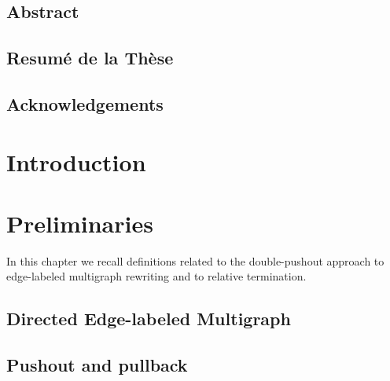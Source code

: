 \documentclass{report}
\begin{document}
  
   
  
 
\newpage
\section*{Abstract}

 
\newpage  
\section*{Resumé de la Thèse}
  
 
\newpage  
\section*{Acknowledgements} 

\newpage       
 
  
\tableofcontents   
\newpage      

\chapter{Introduction}  


\chapter{Preliminaries}
\label{chap:preliminaries}
In this chapter we recall definitions related to the double-pushout approach to edge-labeled multigraph rewriting and to relative termination. 
\section{Directed Edge-labeled Multigraph} 
\label{Preliminaries:Graphs}
 
\section{Pushout and pullback}  
\label{Preliminaries:Pushout}

\end{document}
